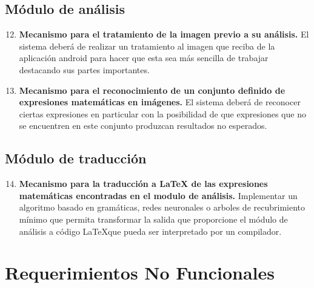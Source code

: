     \subsection{Módulo de análisis}
    \begin{enumerate}[label=\textbf{RF\arabic*.}]
    	\setcounter{enumi}{11}
    	\item \textbf{Mecanismo para el tratamiento de la imagen previo a su análisis.} El sistema deberá de realizar un tratamiento al imagen que reciba de la aplicación android para hacer que esta sea más sencilla de trabajar destacando sus partes importantes.
    	\item \textbf{Mecanismo para el reconocimiento de un conjunto definido de expresiones matemáticas en imágenes.} El sistema deberá de reconocer ciertas expresiones en particular con la posibilidad de que expresiones que no se encuentren en este conjunto produzcan resultados no esperados.
    \end{enumerate}
    
    \subsection{Módulo de traducción}
    \begin{enumerate}[label=\textbf{RF\arabic*.}]
    	\setcounter{enumi}{13}
    	\item \textbf{Mecanismo para la traducción a \LaTeX{} de las expresiones matemáticas encontradas en el modulo de análisis.} Implementar un algoritmo basado en gramáticas, redes neuronales o arboles de recubrimiento mínimo que permita transformar la salida que proporcione el módulo de análisis a código \LaTeX que pueda ser interpretado por un compilador.
    \end{enumerate}
    
\section{Requerimientos No Funcionales} 

 
